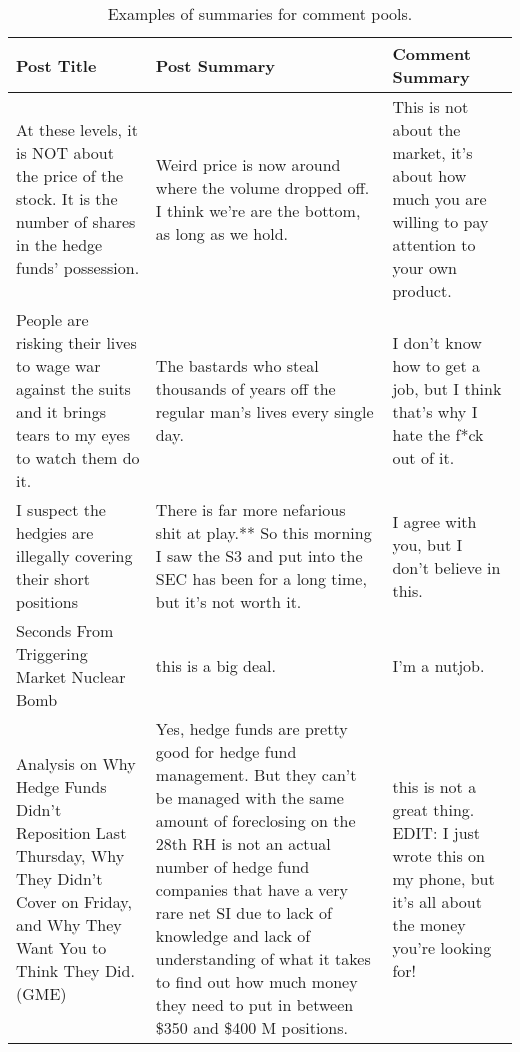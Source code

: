 \begin{table}[ht]%
	\caption{Examples of summaries for comment pools.}%
	\label{tab:postSummariesForCommentPools}%
	\renewcommand{\arraystretch}{1.6}%
	\def\tabularxcolumn#1{m{#1}}
	\begin{adjustbox}{width=1\textwidth}
		\small
	\begin{tabularx}{\textwidth}{@{}>{\centering}m{5.5cm} >{\centering}m{6.5cm} >{\centering\arraybackslash}m{4.5cm}@{}}%
		\toprule     %
		Post Title & Post Summary & Comment Summary\\
		\midrule %
		At these levels, it is NOT about the price of the stock. It is the number of shares in the hedge funds’ possession. & Weird price is now around where the volume dropped off. I think we’re are the bottom, as long as we hold. & This is not about the market, it’s about how much you are willing to pay attention to your own product.\\
		People are risking their lives to wage war against the suits and it brings tears to my eyes to watch them do it. & The bastards who steal thousands of years off the regular man’s lives every single day. & I don’t know how to get a job, but I think that’s why I hate the f*ck out of it.\\
		I suspect the hedgies are illegally covering their short positions & There is far more nefarious shit at play.** So this morning I saw the S3 and put into the SEC has been for a long time, but it’s not
		worth it. & I agree with you, but I don’t believe in this.\\
		30 Seconds From Triggering Market Nuclear Bomb & this is a big deal. & I’m a nutjob.\\
		Analysis on Why Hedge Funds Didn’t Reposition Last Thursday, Why They Didn’t Cover on Friday, and Why They Want You to Think They Did. (GME) & Yes, hedge funds are pretty good for hedge fund management. But they can’t be managed with the same amount of foreclosing on the 28th RH is not an actual number of hedge fund companies that have a very rare net SI due to lack of knowledge and lack of understanding of what it takes to find out how much money they need to put in between \$350 and \$400 M positions. & this is not a great thing. EDIT: I just wrote this on my phone, but it’s all about the money you’re looking for!\\
		\bottomrule %
	\end{tabularx}%
		\end{adjustbox}
\end{table}

